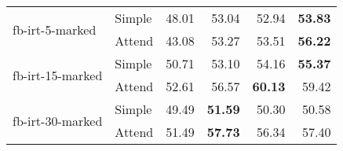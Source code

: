 \begin{tabular}{| l | l | r | r | r | r |}
    \multirow{2}{*}{fb-irt-5-marked}
    & Simple & 48.01 & 53.04 & 52.94 & \textbf{53.83} \\
    & Attend & 43.08 & 53.27 & 53.51 & \textbf{56.22} \\ \hline

    \multirow{2}{*}{fb-irt-15-marked}
    & Simple & 50.71 & 53.10 & 54.16 & \textbf{55.37} \\
    & Attend & 52.61 & 56.57 & \textbf{60.13} & 59.42 \\ \hline

    \multirow{2}{*}{fb-irt-30-marked}
    & Simple & 49.49 & \textbf{51.59} & 50.30 & 50.58 \\
    & Attend & 51.49 & \textbf{57.73} & 56.34 & 57.40 \\ \hline

\end{tabular}
